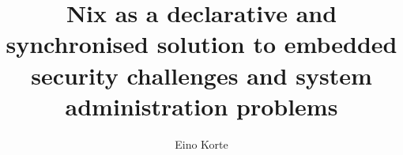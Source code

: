 \documentclass[language=english,version=final,mainfont=none,sharelatex=false]{utuftthesis}
\providecommand{\algorithmname}{Algoritmi}
\begin{document}
\title{Nix as a declarative and synchronised solution to embedded security challenges and system administration problems}
\author{Eino Korte}

\maketitle


\tableofcontents

\listoffigures

\listoftables

\listofacronyms

\renewcommand{\algorithmname}{\listingscaption}

\begin{comment}
To better organize things, create a new tex file for each chapter
and input it below.

Avoid using the å, ä, ö or <space> characters in referred names and
underscores \_ in file names (may break hyperref).

Good luck!
\end{comment}









\printbibliography
\begin{comment}
Important! Create the appendix chapters with command \textbackslash appchapter\{some
name\} instead of \textbackslash chapter\{some name\} for the automagic
page counting to work!
\end{comment}
\end{document}
